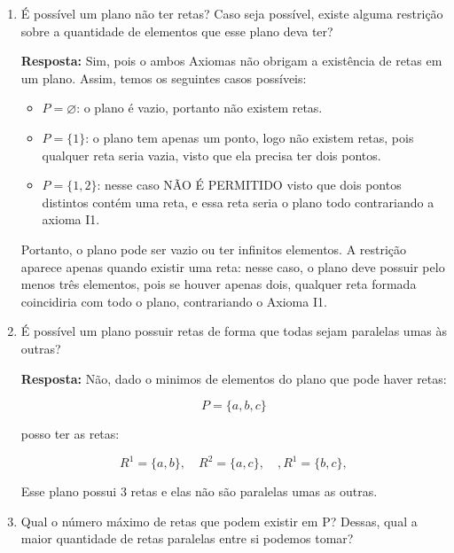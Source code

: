\documentclass[12pt,a4paper]{article}
\begin{document}
\begin{enumerate}[label=\alph*)]

    \item É possível um plano não ter retas? Caso seja possível, existe alguma restrição sobre a quantidade de elementos que esse plano deva ter?

    \textbf{Resposta:} 
    Sim, pois o ambos Axiomas não obrigam a existência de retas em um plano. 
    Assim, temos os seguintes casos possíveis:
    
    \begin{itemize}
        \item $P = \varnothing$: o plano é vazio, portanto não existem retas.
        \item $P = \{1\}$: o plano tem apenas um ponto, logo não existem retas, pois qualquer reta seria vazia, visto que ela precisa ter dois pontos.
        \item $P = \{1,2\}$: nesse caso NÃO É PERMITIDO visto que dois pontos distintos contém uma reta, e essa reta seria o plano todo contrariando a axioma I1.
    \end{itemize}
    
    Portanto, o plano pode ser vazio ou ter infinitos elementos. 
    A restrição aparece apenas quando existir uma reta: nesse caso, o plano deve possuir pelo menos três elementos, pois se houver apenas dois, qualquer reta formada coincidiria com todo o plano, contrariando o Axioma I1.

    \vspace{0.4cm}

    \item É possível um plano possuir retas de forma que todas sejam paralelas umas às outras?

    \textbf{Resposta:} Não, dado o minimos de elementos do plano que pode haver retas:

    \[
    P = \{a, b, c\}
    \]

    posso ter as retas:

    \[
    R^{1} = \{a,b\}, \quad 
    R^{2} = \{a,c\}, \quad,
    R^{1} = \{b,c\},
    \]

    Esse plano possui 3 retas e elas não são paralelas umas as outras.

    \vspace{0.4cm}

    \item Qual o número máximo de retas que podem existir em P? Dessas, qual a maior quantidade de retas paralelas entre si podemos tomar?


\end{enumerate}
\end{document}
